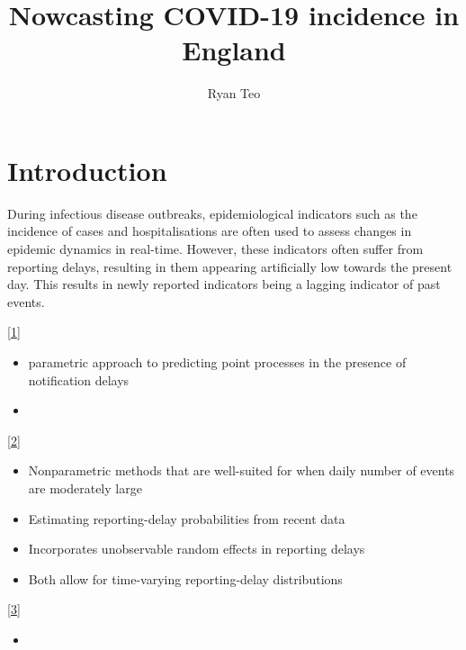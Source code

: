 \documentclass[
  a4paper,
]{article}
\title{Nowcasting COVID-19 incidence in England}
\author{Ryan Teo}
\date{}
\providecommand{\tightlist}{%
  \setlength{\itemsep}{0pt}\setlength{\parskip}{0pt}}\usepackage{longtable,booktabs,array}
\renewcommand*\contentsname{Table of contents}
\newcommand\contentsname{Table of contents}
\begin{document}
\maketitle
\ifdefined\Shaded\renewenvironment{Shaded}{\begin{tcolorbox}[boxrule=0pt, breakable, enhanced, frame hidden, sharp corners, borderline west={3pt}{0pt}{shadecolor}, interior hidden]}{\end{tcolorbox}}\fi

\renewcommand*\contentsname{Table of contents}
{
\hypersetup{linkcolor=}
\setcounter{tocdepth}{3}
\tableofcontents
}
\hypertarget{introduction}{%
\section{Introduction}\label{introduction}}

During infectious disease outbreaks, epidemiological indicators such as
the incidence of cases and hospitalisations are often used to assess
changes in epidemic dynamics in real-time. However, these indicators
often suffer from reporting delays, resulting in them appearing
artificially low towards the present day. This results in newly reported
indicators being a lagging indicator of past events.

\protect\hyperlink{ref-cox1989}{{[}1{]}}

\begin{itemize}
\tightlist
\item
  parametric approach to predicting point processes in the presence of
  notification delays
\item
\end{itemize}

\protect\hyperlink{ref-lawless1994}{{[}2{]}}

\begin{itemize}
\tightlist
\item
  Nonparametric methods that are well-suited for when daily number of
  events are moderately large
\item
  Estimating reporting-delay probabilities from recent data
\item
  Incorporates unobservable random effects in reporting delays
\item
  Both allow for time-varying reporting-delay distributions
\end{itemize}

\protect\hyperlink{ref-huxf6hle2014}{{[}3{]}}

\begin{itemize}
\tightlist
\item
\end{itemize}
\end{document}

